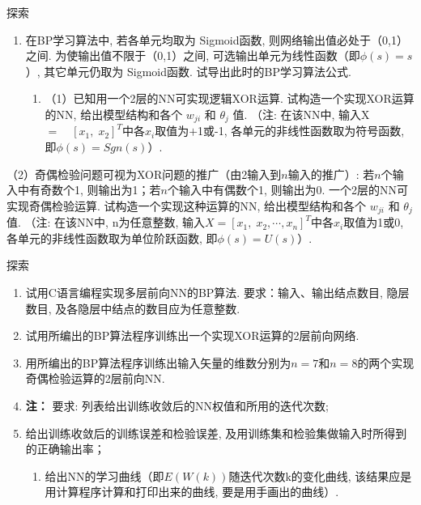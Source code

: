 \begin{custom}[explorecolor]{探索}
\begin{enumerate}
\item 在BP学习算法中, 若各单元均取为 Sigmoid函数, 则网络输出值必处于（0,1）之间. 为使输出值不限于（0,1）之间, 可选输出单元为线性函数（即$\phi(s)=s$）, 其它单元仍取为 Sigmoid函数. 试导出此时的BP学习算法公式.
	\begin{enumerate}
	\item （1）已知用一个2层的NN可实现逻辑XOR运算. 试构造一个实现XOR运算的NN, 给出模型结构和各个 $w_{ji} $ 和 $\theta_{j} $ 值. （注: 在该NN中, 输入X $= \quad [x_{1} ,\;x_{2} ]^{T}$中各$x_{i} $取值为$+$1或-1, 各单元的非线性函数取为符号函数, 即$\phi (s)=Sgn(s)$）.
	\end{enumerate}
\end{enumerate}
（2）奇偶检验问题可视为XOR问题的推广（由2输入到$n$输入的推广）: 若$n$个输入中有奇数个1, 则输出为1；若$n$个输入中有偶数个1, 则输出为0. 一个2层的NN可实现奇偶检验运算. 试构造一个实现这种运算的NN, 给出模型结构和各个
$w_{ji} $ 和 $\theta_{j}$ 值. （注: 在该NN中, n为任意整数, 输入$X=[x_{1} ,\;x_{2} ,\cdots ,x_{n} ]^{T}$中各$x_{i}$取值为1或0, 各单元的非线性函数取为单位阶跃函数, 即$\phi (s)=U(s)$）.
\end{custom}
\begin{custom}[explorecolor]{探索}
\begin{enumerate}
\item 试用C语言编程实现多层前向NN的BP算法. 要求：输入、输出结点数目, 隐层数目, 及各隐层中结点的数目应为任意整数.
\item 试用所编出的BP算法程序训练出一个实现XOR运算的2层前向网络.
\item 用所编出的BP算法程序训练出输入矢量的维数分别为$n=7$和$n=8$的两个实现奇偶检验运算的2层前向NN.
\item[\textbullet] \textbf{注： }要求: 列表给出训练收敛后的NN权值和所用的迭代次数;
\item 给出训练收敛后的训练误差和检验误差, 及用训练集和检验集做输入时所得到的正确输出率；
	\begin{enumerate}
	\item 给出NN的学习曲线（即$E(W(k))$随迭代次数k的变化曲线, 该结果应是用计算程序计算和打印出来的曲线, 要是用手画出的曲线）.
	\end{enumerate}
\end{enumerate}
\end{custom}
